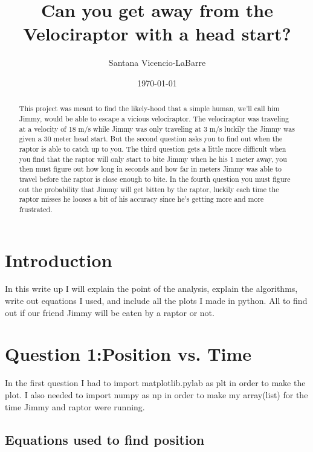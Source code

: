 \documentclass[twocolumn]{revtex4}
\begin{document}
\title{Can you get away from the Velociraptor with a head start?}

\author{Santana Vicencio-LaBarre}
\date{\today}

\begin{abstract}
This project was meant to find the likely-hood that a simple human, we'll call him Jimmy, would be able to escape a vicious velociraptor. The velociraptor was traveling at a velocity of 18 m/s while Jimmy was only traveling at 3 m/s luckily the Jimmy was given a 30 meter head start. But the second question asks you to find out when the raptor is able to catch up to you. The third question gets a little more difficult when you find that the raptor will only start to bite Jimmy when he his 1 meter away, you then must figure out how long in seconds and how far in meters Jimmy was able to travel before the raptor is close enough to bite. In the fourth question you must figure out the probability that Jimmy will get bitten by the raptor, luckily each time the raptor misses he looses a bit of his accuracy since he's getting more and more frustrated. 


\end{abstract}


\maketitle

\section{Introduction}

In this write up I will explain the point of the analysis, explain the algorithms, write out equations I used, and include all the plots I made in python. All to find out if our friend Jimmy will be eaten by a raptor or not.


\section{Question 1:Position vs. Time} 
In the first question I had to import matplotlib.pylab as plt in order to make the plot. I also needed to import numpy as np in order to make my array(list) for the time Jimmy and raptor were running. 

\subsection{Equations used to find position}
\end{document}
